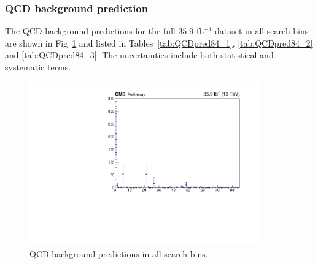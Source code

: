 \subsubsection{QCD background prediction}
The QCD background predictions for the full $35.9$ fb$^{-1}$ dataset in all search bins are shown in Fig~\ref{fig:SBPrediction} and listed in Tables~\ref{tab:QCDpred84_1}, \ref{tab:QCDpred84_2} and \ref{tab:QCDpred84_3}. The uncertainties include both statistical and systematic terms.
\begin{figure}[htbp]
\begin{center}
\includegraphics[width=0.89\textwidth]{sections/mc4/Backgrounds/QCD/figures/84sb/_sb_Data.pdf}
\end{center}\caption{QCD background predictions in all search bins.}
\label{fig:SBPrediction}
\end{figure}

